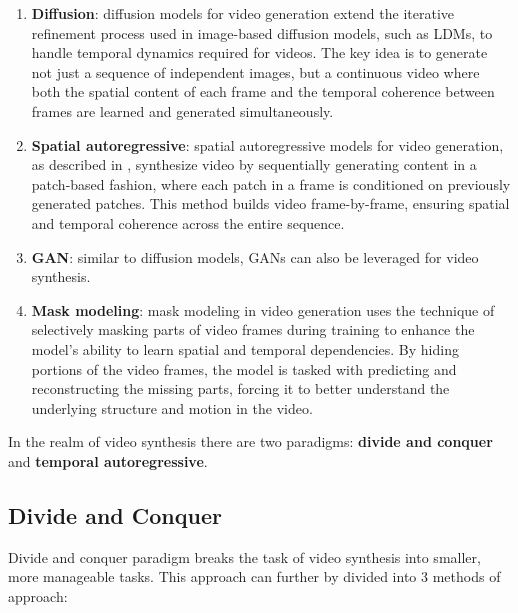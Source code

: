 \begin{enumerate}
    \item \textbf{Diffusion}: diffusion models for video generation extend the iterative refinement process used in image-based diffusion models, such as LDMs, to handle temporal dynamics required for videos. The key idea is to generate not just a sequence of independent images, but a continuous video where both the spatial content of each frame and the temporal coherence between frames are learned and generated simultaneously.
    \item \textbf{Spatial autoregressive}: spatial autoregressive models for video generation, as described in \cite{graves2013generating}, synthesize video by sequentially generating content in a patch-based fashion, where each patch in a frame is conditioned on previously generated patches. This method builds video frame-by-frame, ensuring spatial and temporal coherence across the entire sequence.
    \item \textbf{GAN}: similar to diffusion models, GANs can also be leveraged for video synthesis. 
    \item \textbf{Mask modeling}: mask modeling in video generation uses the technique of selectively masking parts of video frames during training to enhance the model's ability to learn spatial and temporal dependencies. By hiding portions of the video frames, the model is tasked with predicting and reconstructing the missing parts, forcing it to better understand the underlying structure and motion in the video.
\end{enumerate}

In the realm of video synthesis there are two paradigms: \textbf{divide and conquer} and \textbf{temporal autoregressive}.

\subsection*{Divide and Conquer}

Divide and conquer paradigm breaks the task of video synthesis into smaller, more manageable tasks. This approach can further by divided into 3 methods of approach:

